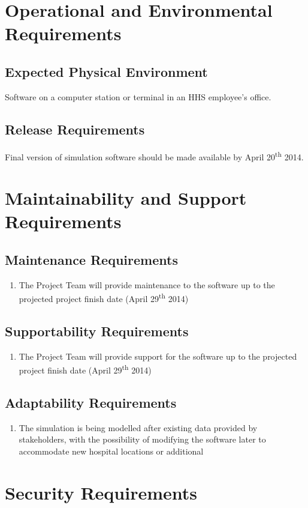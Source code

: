 \documentclass[paper=letter, fontsize=10pt]{scrartcl}
\numberwithin{equation}{section}		%
\numberwithin{figure}{section}			%
\numberwithin{table}{section}				%
\newcommand{\ts}{\textsuperscript}
\begin{document}
\section{Operational and Environmental Requirements}
\subsection{Expected Physical Environment}
Software on a computer station or terminal in an HHS employee's office.
\subsection{Release Requirements}
Final version of simulation software should be made available by April 20\ts{th} 2014.

\section{Maintainability and Support Requirements}
\subsection{Maintenance Requirements}
	\begin{enumerate}
		\item The Project Team will provide maintenance to the software up to the projected project finish date (April 29\ts{th} 2014)
	\end{enumerate}
\subsection{Supportability Requirements}
	\begin{enumerate}
		\item The Project Team will provide support for the software up to the projected project finish date (April 29\ts{th} 2014)
	\end{enumerate}
\subsection{Adaptability Requirements}
	\begin{enumerate}
		\item The simulation is being modelled after existing data provided by stakeholders, with the possibility of modifying the software later to accommodate new hospital locations or additional  
	\end{enumerate}

\section{Security Requirements}
\end{document}
